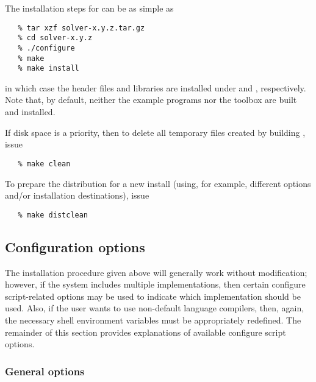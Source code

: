 \vspace{0.2in}
{\noindent}The installation steps for {\sundials} can be as simple as 
\begin{verbatim}
   % tar xzf solver-x.y.z.tar.gz
   % cd solver-x.y.z
   % ./configure
   % make
   % make install
\end{verbatim}
in which case the {\sundials} header files and libraries are installed under 
and , respectively. Note that, by default, neither the example programs nor the 
{\sundialsTB} toolbox are built and installed.

If disk space is a priority, then to delete all temporary files created by building {\sundials}, issue
\begin{verbatim}
   % make clean
\end{verbatim}

To prepare the {\sundials} distribution for a new install (using, for example, different options and/or
installation destinations), issue
\begin{verbatim}
   % make distclean
\end{verbatim}


\subsection{Configuration options}\label{ss:configuration_options}

The installation procedure given above will generally work without modification;
however, if the system includes multiple {\mpi} implementations, then certain
configure script-related options may be used to indicate which {\mpi}
implementation should be used. Also, if the user wants to use non-default
language compilers, then, again, the necessary shell environment variables must
be appropriately redefined.
The remainder of this section provides explanations of available configure script
options.


\subsubsection*{General options}


